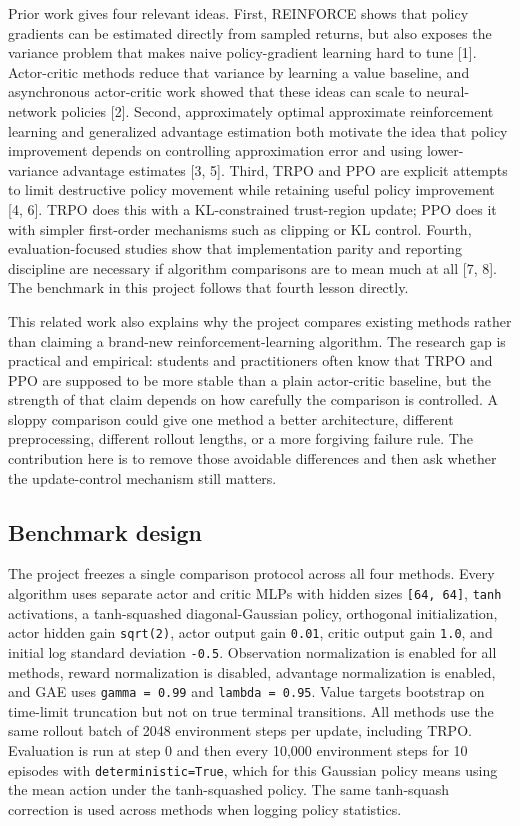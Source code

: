 \documentclass{article}
\begin{document}
Prior work gives four relevant ideas. First, REINFORCE shows that policy gradients can be estimated directly from sampled returns, but also exposes the variance problem that makes naive policy-gradient learning hard to tune [1]. Actor-critic methods reduce that variance by learning a value baseline, and asynchronous actor-critic work showed that these ideas can scale to neural-network policies [2]. Second, approximately optimal approximate reinforcement learning and generalized advantage estimation both motivate the idea that policy improvement depends on controlling approximation error and using lower-variance advantage estimates [3, 5]. Third, TRPO and PPO are explicit attempts to limit destructive policy movement while retaining useful policy improvement [4, 6]. TRPO does this with a KL-constrained trust-region update; PPO does it with simpler first-order mechanisms such as clipping or KL control. Fourth, evaluation-focused studies show that implementation parity and reporting discipline are necessary if algorithm comparisons are to mean much at all [7, 8]. The benchmark in this project follows that fourth lesson directly.

This related work also explains why the project compares existing methods rather than claiming a brand-new reinforcement-learning algorithm. The research gap is practical and empirical: students and practitioners often know that TRPO and PPO are supposed to be more stable than a plain actor-critic baseline, but the strength of that claim depends on how carefully the comparison is controlled. A sloppy comparison could give one method a better architecture, different preprocessing, different rollout lengths, or a more forgiving failure rule. The contribution here is to remove those avoidable differences and then ask whether the update-control mechanism still matters.

\subsection{Benchmark design}

The project freezes a single comparison protocol across all four methods. Every algorithm uses separate actor and critic MLPs with hidden sizes \texttt{[64, 64]}, \texttt{tanh} activations, a tanh-squashed diagonal-Gaussian policy, orthogonal initialization, actor hidden gain \texttt{sqrt(2)}, actor output gain \texttt{0.01}, critic output gain \texttt{1.0}, and initial log standard deviation \texttt{-0.5}. Observation normalization is enabled for all methods, reward normalization is disabled, advantage normalization is enabled, and GAE uses \texttt{gamma = 0.99} and \texttt{lambda = 0.95}. Value targets bootstrap on time-limit truncation but not on true terminal transitions. All methods use the same rollout batch of 2048 environment steps per update, including TRPO. Evaluation is run at step 0 and then every 10{,}000 environment steps for 10 episodes with \texttt{deterministic=True}, which for this Gaussian policy means using the mean action under the tanh-squashed policy. The same tanh-squash correction is used across methods when logging policy statistics.
\end{document}
